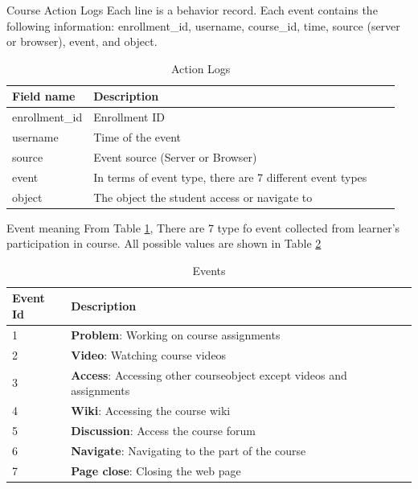 \documentclass[10pt]{beamer}
\begin{document}
    \begin{frame}[fragile]{Course Action Logs}
        Each line is a behavior record. Each event contains the following 
        information: enrollment\_id, username, course\_id, time, 
        source (server or browser), event, and object. 

        \begin{table}
            \caption{\label{tab:course-action-logs}Action Logs}
            \begin{tabular}{l*{2}{l}r}
                Field name      & Description \\
                \hline
                enrollment\_id  & Enrollment ID \\
                username        & Time of the event \\
                source          & Event source (Server or Browser) \\
                event           & In terms of event type, there are 7 different event types \\
                object          & The object the student access or navigate to \\
            \end{tabular}
        \end{table}
    \end{frame}

    \begin{frame}[fragile]{Event meaning}
        From Table \ref{tab:course-action-logs}, There are 7 type fo event collected
        from learner's participation in course. All possible values are shown in 
        Table \ref{tab:event-meaning}
        \begin{table}
            \caption{\label{tab:event-meaning}Events}
            \begin{tabular}{l*{2}{l}r}
                Event Id        & Description \\
                \hline
                1               & \textbf{Problem}: Working on course assignments \\
                2               & \textbf{Video}: Watching course videos \\
                3               & \textbf{Access}: Accessing other courseobject except videos and assignments \\
                4               & \textbf{Wiki}: Accessing the course wiki \\
                5               & \textbf{Discussion}: Access the course forum \\
                6               & \textbf{Navigate}:  Navigating to the part of the course \\
                7               & \textbf{Page close}:  Closing the web page \\
            \end{tabular}
        \end{table}
    \end{frame}
\end{document}
